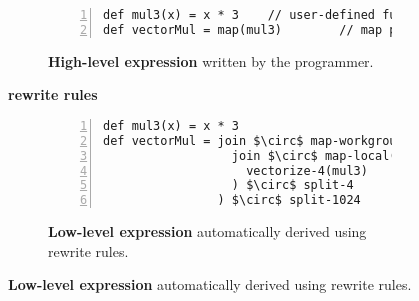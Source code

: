 \begin{figure}[t]
\centering

\begin{subfigure}[b]{.85\linewidth}
\begin{lstlisting}[mathescape,numbers=left]
def mul3(x) = x * 3    // user-defined function
def vectorMul = map(mul3)        // map pattern
\end{lstlisting}
\caption{\textbf{High-level expression} written by the programmer.}
\label{fig:codeex:map}
\end{subfigure}

\vspace{-5pt}
\begin{minipage}{0.1\linewidth}
\vspace{0pt}
\centering
{}
\end{minipage}
\begin{minipage}{0.25\linewidth}
\vspace{-5pt}
\centering
\textbf{rewrite rules}
\end{minipage}
\begin{minipage}{0.1\linewidth}
\vspace{0pt}
\centering
{}
\end{minipage}

\begin{subfigure}[b]{\linewidth}
\centering
\begin{minipage}{.85\linewidth}
\begin{lstlisting}[mathescape,numbers=left]
def mul3(x) = x * 3
def vectorMul = join $\circ$ map-workgroup(
                  join $\circ$ map-local(
                    vectorize-4(mul3)
                  ) $\circ$ split-4
                ) $\circ$ split-1024
\end{lstlisting}
\end{minipage}
\caption{\textbf{Low-level expression} automatically derived using rewrite rules.}
\label{fig:codeex:impl}
\end{subfigure}


\end{figure}
